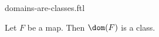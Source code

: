 \documentclass{stex}
\begin{document}
\begin{smodule}{domains-are-classes.ftl}
  \begin{forthel}
    \begin{lemma}
      Let $F$ be a map.
      Then $\dom(F)$ is a class.
    \end{lemma}
  \end{forthel}
\end{smodule}
\end{document}
